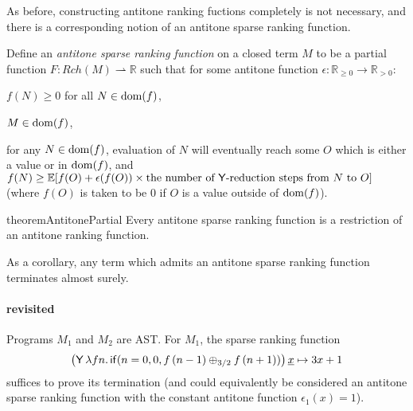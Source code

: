 As before, constructing antitone ranking fuctions completely is not necessary, and there is a corresponding notion of an antitone sparse ranking function.

\begin{definition}
Define an \emph{antitone sparse ranking function} on a closed term $M$ to be a partial function $F : Rch(M) \rightharpoonup \mathbb{R}$ such that for some antitone function $\epsilon : \mathbb{R}_{\geq 0} \to \mathbb{R}_{>0}$:
\begin{inparaenum}[(i)]
\item $f(N) \geq 0$ for all $N \in \operatorname{dom}(f)$,
\item $M \in \operatorname{dom}(f)$,
\item for any $N \in \operatorname{dom}(f)$, evaluation of $N$ will eventually reach some $O$ which is either a value or in $\operatorname{dom}(f)$, and $f(N) \geq \mathbb E [f(O) + \epsilon(f(O)) \times \text{the number of $\mathsf{Y}$-reduction steps from $N$ to $O$}]$ (where $f(O)$ is taken to be 0 if $O$ is a value outside of $\operatorname{dom}(f)$).
\end{inparaenum}
\end{definition}

\begin{restatable}{theorem}{AntitonePartial}  \label{thm:antitone partial implies rankable}
  Every antitone sparse ranking function is a restriction of an antitone ranking function.
\end{restatable}

As a corollary, any term which admits an antitone sparse ranking function terminates almost surely.

\paragraph*{ revisited}
Programs $M_1$ and $M_2$ are AST. For $M_1$, the sparse ranking function 
\begin{align*}
\big(\mathsf{Y} \, \lambda f n . \, \mathsf{if}(n=0, 0, f \, (n-1) \oplus_{3/2} f \, (n+1))\big) \, \underline x \mapsto 3x + 1
\end{align*}
suffices to prove its termination (and could equivalently be considered an antitone sparse ranking function with the constant antitone function $\epsilon_1(x) = 1$).


